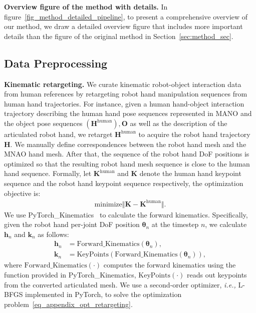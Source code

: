 \textcolor{myblue}{\noindent\textbf{Overview figure of the method with details.} In figure~\ref{fig_method_detailed_pipeline}, to present a comprehensive overview of our method, we draw a detailed overview figure that includes more important details than the figure of the original method in Section~\ref{sec:method_sec}. }



\subsection{Data Preprocessing} \label{sec:supp_method_dta_preprocess}



\noindent\textbf{Kinematic retargeting. } 
We curate kinematic robot-object interaction data from human references by retargeting robot hand manipulation sequences from human hand trajectories. For instance, given a human hand-object interaction trajectory describing the human hand pose sequences represented in MANO and the object pose sequences $(\mathbf{H}^{\text{human}}), \mathbf{O}$ as well as the description of the articulated robot hand, we retarget $\mathbf{H}^{\text{human}}$ to acquire the robot hand trajectory $\mathbf{H}$. We manually define correspondences between the robot hand mesh and the MNAO hand mesh. After that, the sequence of the robot hand DoF positions is optimized so that the resulting robot hand mesh sequence is close to the human hand sequence. Formally, let $\mathbf{K}^{\text{human}}$ and $\mathbf{K}$ denote the human hand keypoint sequence and the robot hand keypoint sequence respectively, the optimization objective is:
\begin{align}
    \text{minimize} \Vert \mathbf{K} - \mathbf{K}^{\text{human}} \Vert.  \label{eq_appendix_opt_retargeting}
\end{align}
We use PyTorch\_Kinematics~\citep{Zhong_PyTorch_Kinematics_2024} to calculate the forward kinematics. Specifically, given the robot hand per-joint DoF position $\mathbf{\theta}_n$ at the timestep $n$, we calculate $\mathbf{h}_n$ and $\mathbf{k}_n$ as follows:
\begin{align}
    \mathbf{h}_n &= \text{Forward\_Kinematics}(\mathbf{\theta}_n), \\
    \mathbf{k}_n &= \text{KeyPoints}(\text{Forward\_Kinematics}(\mathbf{\theta}_n)),
\end{align}
where $\text{Forward\_Kinematics}(\cdot)$ computes the forward kinematics using the function provided in PyTorch\_Kinematics, $\text{KeyPoints}(\cdot)$ reads out keypoints from the converted articulated mesh. 
\textcolor{myblue}{
We use a second-order optimizer, \textit{i.e.,} L-BFGS implemented in PyTorch, to solve the optimization problem~\ref{eq_appendix_opt_retargeting}. 
}




